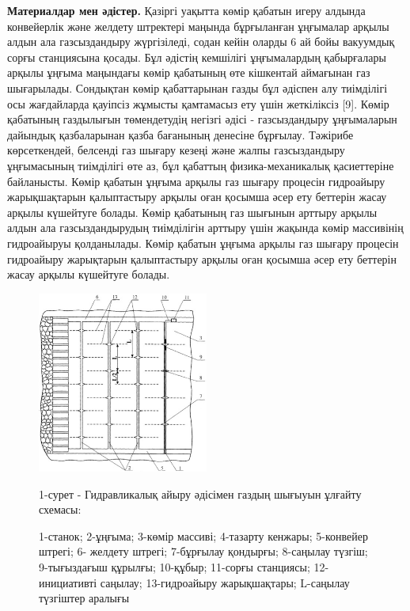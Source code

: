 \begin{multicols}{2}
{\bfseries Материалдар мен әдістер.} Қазіргі уақытта көмір қабатын игеру
алдында конвейерлік және желдету штректері маңында бұрғыланған ұңғымалар
арқылы алдын ала газсыздандыру жүргізіледі, содан кейін оларды 6 ай бойы
вакуумдық сорғы станциясына қосады. Бұл әдістің кемшілігі ұңғымалардың
қабырғалары арқылы ұңғыма маңындағы көмір қабатының өте кішкентай
аймағынан газ шығарылады. Сондықтан көмір қабаттарынан газды бұл әдіспен
алу тиімділігі осы жағдайларда қауіпсіз жұмысты қамтамасыз ету үшін
жеткіліксіз {[}9{]}. Көмір қабатының газдылығын төмендетудің негізгі
әдісі - газсыздандыру ұңғымаларын дайындық қазбаларынан қазба бағанының
денесіне бұрғылау. Тәжірибе көрсеткендей, белсенді газ шығару кезеңі
және жалпы газсыздандыру ұңғымасының тиімділігі өте аз, бұл қабаттың
физика-механикалық қасиеттеріне байланысты. Көмір қабатын ұңғыма арқылы
газ шығару процесін гидроайыру жарықшақтарын қалыптастыру арқылы оған
қосымша әсер ету беттерін жасау арқылы күшейтуге болады. Көмір қабатының
газ шығынын арттыру арқылы алдын ала газсыздандырудың тиімділігін
арттыру үшін жақында көмір массивінің гидроайыруы қолданылады. Көмір
қабатын ұңғыма арқылы газ шығару процесін гидроайыру жарықтарын
қалыптастыру арқылы оған қосымша әсер ету беттерін жасау арқылы
күшейтуге болады.
\end{multicols}

\begin{figure}[H]
	\centering
	\includegraphics[width=0.5\textwidth]{assets/1133}
	\caption*{1-сурет - Гидравликалық айыру әдісімен газдың шығыуын ұлғайту схемасы:}
	\caption*{1-станок; 2-ұңғыма; 3-көмір массиві; 4-тазарту кенжары; 5-конвейер
штрегі; 6- желдету штрегі; 7-бұрғылау қондырғы; 8-саңылау түзгіш;
9-тығыздағыш құрылғы; 10-құбыр; 11-сорғы станциясы; 12-инициативті
саңылау; 13-гидроайыру жарықшақтары; L-саңылау түзгіштер аралығы}
\end{figure}

